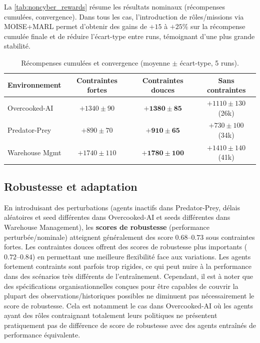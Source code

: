 La \autoref{tab:noncyber_rewards} résume les résultats nominaux (récompenses cumulées, convergence).
Dans tous les cas, l'introduction de rôles/missions via MOISE+MARL permet d'obtenir des gains de $+15$ à $+25\%$ sur la récompense cumulée finale et de réduire l'écart-type entre runs, témoignant d'une plus grande stabilité.

\begin{table}[h!]
  \centering
  \caption{Récompenses cumulées et convergence (moyenne $\pm$ écart-type, 5 runs).}
  \label{tab:noncyber_rewards}
  \renewcommand{\arraystretch}{1.2}
  \small
  \begin{tabular}{lccc}
    \hline
    \textbf{Environnement} & \textbf{Contraintes fortes} & \textbf{Contraintes douces} & \textbf{Sans contraintes} \\
    \hline
    Overcooked-AI          & $+1340 \pm 90$              & $\mathbf{+1380 \pm 85}$     & $+1110 \pm 130$ (26k)     \\
    Predator-Prey          & $+890 \pm 70$               & $\mathbf{+910 \pm 65}$      & $+730 \pm 100$ (34k)      \\
    Warehouse Mgmt         & $+1740 \pm 110$             & $\mathbf{+1780 \pm 100}$    & $+1410 \pm 140$ (41k)     \\
    \hline
  \end{tabular}
\end{table}

\subsection*{Robustesse et adaptation}

En introduisant des perturbations (agents inactifs dans Predator-Prey, délais aléatoires et seed différentes dans Overcooked-AI et seeds différentes dans Warehouse Management), les \textbf{scores de robustesse} (performance perturbée/nominale) atteignent généralement des score $0.68$–$0.73$ sous contraintes fortes.
Les contraintes douces offrent des scores de robustesse plus importants ($0.72$–$0.84$) en permettant une meilleure flexibilité face aux variations. Les agents fortement contraints sont parfois trop rigides, ce qui peut nuire à la performance dans des scénarios très différents de l'entraînement.
Cependant, il est à noter que des spécifications organisationnelles conçues pour être capables de couvrir la plupart des observations/historiques possibles ne diminuent pas nécessairement le score de robustesse. Cela est notamment le cas dans Overcooked-AI où les agents ayant des rôles contraignant totalement leurs politiques ne présentent pratiquement pas de différence de score de robustesse avec des agents entraînés de performance équivalente.

